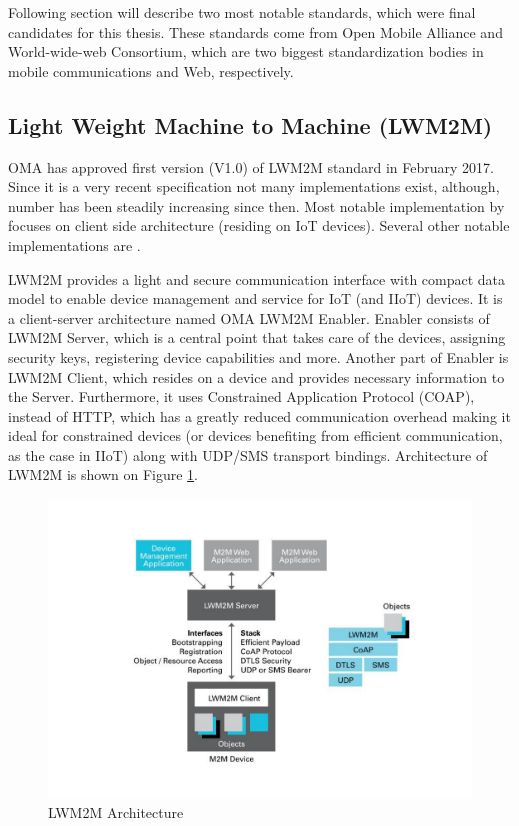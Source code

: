Following section will describe two most notable standards, which were final candidates for this thesis. These standards come from Open Mobile Alliance and World-wide-web Consortium, which are two biggest standardization bodies in mobile communications and Web, respectively.

\subsection{Light Weight Machine to Machine (LWM2M)}
\label{section:LWM2M}

OMA has approved first version (V1.0) of LWM2M standard in February 2017. Since it is a very recent specification not many implementations exist, although, number has been steadily increasing since then. Most notable implementation by \cite{Rao2015} focuses on client side architecture (residing on IoT devices). Several other notable implementations are \cite{LWM2MImplementation1, LWM2MImplementation2}.

LWM2M provides a light and secure communication interface with compact data model to enable device management and service for IoT (and IIoT) devices. It is a client-server architecture named OMA LWM2M Enabler. Enabler consists of LWM2M Server, which is a central point that takes care of the devices, assigning security keys, registering device capabilities and more. Another part of Enabler is LWM2M Client, which resides on a device and provides necessary information to the Server. Furthermore, it uses Constrained Application Protocol (COAP), instead of HTTP, which has a greatly reduced communication overhead making it ideal for constrained devices (or devices benefiting from efficient communication, as the case in IIoT) along with UDP/SMS transport bindings. Architecture of LWM2M is shown on Figure \ref{fig:LWM2MArchitecture}.

\begin{figure}[ht]
	\begin{center}
		\includegraphics[width=\textwidth]{images/LWM2M-Architecture}
		\caption{LWM2M Architecture}
		\label{fig:LWM2MArchitecture}
	\end{center}
\end{figure}

